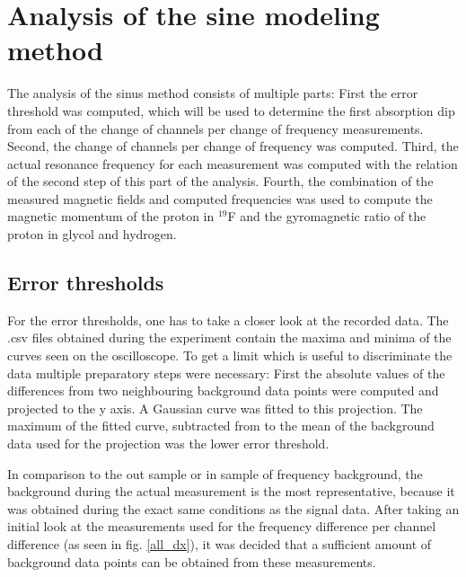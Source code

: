\section{Analysis of the sine modeling  method}
The analysis of the sinus method consists of multiple parts: First the error threshold was computed, which will be used to determine the first absorption dip from each of the change of channels per change of frequency measurements.
Second, the change of channels per change of frequency was computed. 
Third, the actual resonance frequency for each measurement was computed with the relation of the second step of this part of the analysis.
Fourth, the combination of the measured magnetic fields and computed frequencies was used to compute the magnetic momentum of the proton in $^{19}$F and the gyromagnetic ratio of the proton in glycol and hydrogen.
\subsection{Error thresholds}
For the error thresholds, one has to take a closer look at the recorded data. The .csv files obtained during the experiment contain the maxima and minima of the curves seen on the oscilloscope. To get a limit which is useful to discriminate the data multiple preparatory steps were necessary: First the absolute values of the differences from two neighbouring background data points were computed and projected to the y axis. A Gaussian curve was fitted to this projection. The maximum of the fitted curve, subtracted from to the mean of the background data used for the projection was the lower error threshold.\par 
In comparison to the out sample or in sample of frequency background, the background during the actual measurement is the most representative, because it was obtained during the exact same conditions as the signal data.
After taking an initial look at the measurements used for the frequency difference per channel difference (as seen in fig. \ref{all_dx}), it was decided that a sufficient amount of background data points can be obtained from these measurements. 
